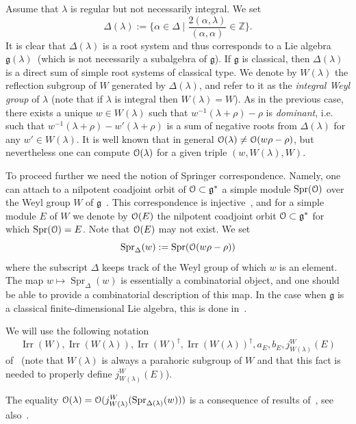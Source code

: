 \documentclass{emsprocart}
\begin{document}
Assume that $\lambda$ is regular but not necessarily integral. We set $$\Delta(\lambda):=\{\alpha\in\Delta\mid \frac{2(\alpha, \lambda)}{(\alpha, \alpha)}\in\mathbb Z\}.$$ It is clear that $\Delta(\lambda)$ is a root system and thus corresponds to a Lie algebra $\mathfrak g(\lambda)$~(which is not necessarily a subalgebra of $\mathfrak g$). If $\mathfrak g$ is classical, then $\Delta(\lambda)$ is a direct sum of simple root systems of classical type. We denote by $W(\lambda)$ the reflection subgroup of $W$ generated by $\Delta(\lambda)$, and refer to it as the {\it integral Weyl group} of $\lambda$ (note that if $\lambda$ is integral then $W(\lambda)=W$). As in the previous case, there exists a unique $w\in W(\lambda)$ such that $w^{-1}(\lambda+\rho)-\rho$ is {\it dominant}, i.e. such that $w^{-1}(\lambda+\rho)-w'(\lambda+\rho)$ is a sum of negative roots from $\Delta(\lambda)$ for any $w'\in W(\lambda)$. It is well known that in general $\EuScript O(\lambda)\ne\EuScript O(w\rho-\rho)$, but nevertheless one can compute $\EuScript O(\lambda)$ for a given triple $(w, W(\lambda), W)$.

To proceed further we need the notion of Springer correspondence. Namely,  one can attach to a nilpotent coadjoint orbit of $\EuScript O\subset\mathfrak g^*$ a simple module $\operatorname{Spr}(\EuScript O)$ over the Weyl group $W$ of $\mathfrak g$~\cite[Section 10.1]{CM}. This correspondence is injective~\cite[Section 10.1]{CM}, and for a simple module $E$ of $W$ we denote by $\EuScript O(E)$ the nilpotent coadjoint orbit $\EuScript O\subset\mathfrak g^*$ for which $\operatorname{Spr}(\EuScript O)=E$. Note that $\EuScript O(E)$ may not exist. We set $$\operatorname{Spr}_{\Delta}(w):=\operatorname{Spr}(\EuScript O(w\rho-\rho))$$where the subscript $\Delta$ keeps track of the Weyl group of which $w$ is an element.
The map $w\mapsto \operatorname{Spr}_{\Delta}(w)$ is essentially a combinatorial object, and one should be able to provide a combinatorial description of this map. In the case when $\mathfrak g$ is a classical finite-dimensional Lie algebra, this is done in~\cite{Barbasch-Vogan}.

We will use the following notation $$\operatorname{Irr}(W), \operatorname{Irr}(W(\lambda)), \operatorname{Irr}(W)^\dagger, \operatorname{Irr}(W(\lambda))^\dagger, a_E, b_E, j^W_{W(\lambda)}(E)$$
of~\cite{Lusztig} (note that $W(\lambda)$ is always a parahoric subgroup of $W$ and that this fact is needed to properly define $j^W_{W(\lambda)}(E)$).

The equality $\EuScript O(\lambda)=\EuScript O(j^W_{W(\lambda)}(\operatorname{Spr}_{\Delta(\lambda)}(w)))$ is a consequence of results of~\cite{Jo}, see also~\cite[Subection 7.6]{LO}.
\end{document}
